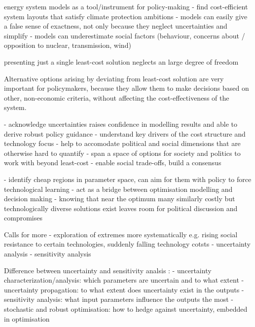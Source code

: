 
energy system models as a tool/instrument for policy-making
- find cost-efficient system layouts that satisfy climate protection ambitions
- models can easily give a false sense of exactness, not only because they neglect uncertainties and simplify
- models can underestimate social factors (behaviour, concerns about / opposition to nuclear, transmission, wind)

presenting just a single least-cost solution neglects an large degree of freedom \cite{nearoptimal}

Alternative options arising by deviating from least-cost solution are very important for policymakers,
because they allow them to make decisions based on other, non-economic criteria,
without affecting the cost-effectiveness of the system.

- acknowledge uncertainties raises confidence in modelling results and able to derive robust policy guidance
- understand key drivers of the cost structure and technology focus \cite{usher_value_2015,moret_characterization_2017}
- help to accomodate political and social dimensions that are otherwise hard to quantify
- span a space of options for society and politics to work with beyond least-cost
- enable social trade-offs, build a consensus

- identify cheap regions in parameter space, can aim for them with policy to force technological learning
- act as a bridge between optimisation modelling and decision making
- knowing that near the optimum many similarly costly but technologically diverse solutions exist leaves room for political discussion and compromises


Calls for more
- exploration of extremes more systematically e.g. rising social resistance to certain technologies, suddenly falling technology cotsts \cite{mccollum_energy_2020,pye_modelling_2020}
- uncertainty analysis \cite{Pfenninger2014,yue_review_2018,pye_assessing_2018,pye_modelling_2020,decarolis_leveraging_nodate} 
- sensitivity analysis \cite{bistline_deepening_2020,trondle_trade-offs_2020} 

Difference between uncertainty and sensitivity analsis \cite{usher_value_2016}:
- uncertainty characterization/analysis: which parameters are uncertain and to what extent
- uncertainty propagation: to what extent does uncertainty exist in the outputs
- sensitivity analysis: what input parameters influence the outputs the most
- stochastic and robust optimisation: how to hedge against uncertainty, embedded in optimisation

